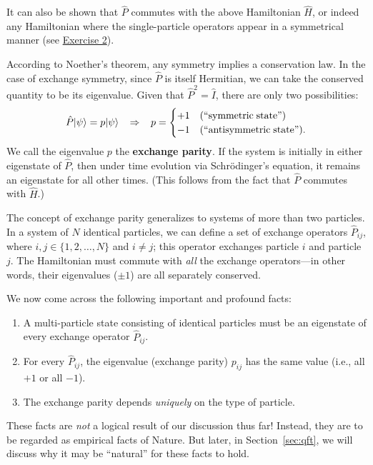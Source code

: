 \documentclass[pra,11pt]{revtex4}
\begin{document}
It can also be shown that $\hat{P}$ commutes with the above
Hamiltonian $\hat{H}$, or indeed any Hamiltonian where the
single-particle operators appear in a symmetrical manner (see
\hyperref[ex:2]{Exercise 2}).

According to Noether's theorem, any symmetry implies a conservation
law.  In the case of exchange symmetry, since $\hat{P}$ is itself
Hermitian, we can take the conserved quantity to be its eigenvalue.
Given that $\hat{P}^2 = \hat{I}$, there are only two possibilities:
$$\hat{P} |\psi\rangle = p|\psi\rangle \;\;\;\Rightarrow\;\;\; p = \begin{cases}+1 & \textrm{(``symmetric\;state'')} \\ -1 & \textrm{(``antisymmetric\;state'').}\end{cases}$$
We call the eigenvalue $p$ the \textbf{exchange parity}.  If the
system is initially in either eigenstate of $\hat{P}$, then under time
evolution via Schr\"odinger's equation, it remains an eigenstate for
all other times.  (This follows from the fact that $\hat{P}$ commutes
with $\hat{H}$.)

The concept of exchange parity generalizes to systems of more than two
particles.  In a system of $N$ identical particles, we can define a
set of exchange operators $\hat{P}_{ij}$, where
$i,j\in\{1,2,\dots,N\}$ and $i\ne j$; this operator exchanges particle
$i$ and particle $j$.  The Hamiltonian must commute with \textit{all}
the exchange operators---in other words, their eigenvalues ($\pm 1$)
are all separately conserved.

We now come across the following important and profound facts:
\begin{enumerate}
\item A multi-particle state consisting of identical particles must be
  an eigenstate of every exchange operator $\hat{P}_{ij}$.

\item For every $\hat{P}_{ij}$, the eigenvalue (exchange parity)
  $p_{ij}$ has the same value (i.e., all $+1$ or all $-1$).

\item The exchange parity depends \textit{uniquely} on the type of
  particle.
\end{enumerate}
These facts are \textit{not} a logical result of our discussion thus
far!  Instead, they are to be regarded as empirical facts of Nature.
But later, in Section~\ref{sec:qft}, we will discuss why it may be
``natural'' for these facts to hold.
\end{document}
